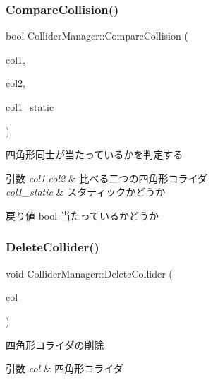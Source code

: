 \subsubsection{\texorpdfstring{Compare\+Collision()}{CompareCollision()}}
{\footnotesize\ttfamily bool Collider\+Manager\+::\+Compare\+Collision (\begin{DoxyParamCaption}\item[{Square\+Pos\+Col \&}]{col1,  }\item[{Square\+Pos\+Col \&}]{col2,  }\item[{bool}]{col1\+\_\+static }\end{DoxyParamCaption})\hspace{0.3cm}{\ttfamily [protected]}}



四角形同士が当たっているかを判定する 


\begin{DoxyParams}{引数}
{\em col1,col2} & 比べる二つの四角形コライダ \\
\hline
{\em col1\+\_\+static} & スタティックかどうか \\
\hline
\end{DoxyParams}
\begin{DoxyReturn}{戻り値}
bool 当たっているかどうか 
\end{DoxyReturn}
\mbox{\label{class_collider_manager_afb805cdb8c6e5872d54ecbb9368ba38d}} 
\subsubsection{\texorpdfstring{Delete\+Collider()}{DeleteCollider()}}
{\footnotesize\ttfamily void Collider\+Manager\+::\+Delete\+Collider (\begin{DoxyParamCaption}\item[{\mbox{\hyperlink{class_square_collider}{Square\+Collider}} $\ast$}]{col }\end{DoxyParamCaption})}



四角形コライダの削除 


\begin{DoxyParams}{引数}
{\em col} & 四角形コライダ \\
\hline
\end{DoxyParams}
\mbox{\label{class_collider_manager_a6d397c24cd8fdac77685d71842b8ae2e}} 
